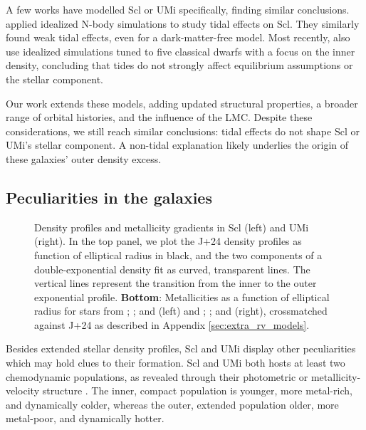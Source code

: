 A few works have modelled Scl or UMi specifically, finding similar
conclusions. \citet{iorio+2019} applied idealized N-body simulations to
study tidal effects on Scl. They similarly found weak tidal effects,
even for a dark-matter-free model. Most recently,
\citet{tchiorniy+genina2025} also use idealized simulations tuned to
five classical dwarfs with a focus on the inner density, concluding that
tides do not strongly affect equilibrium assumptions or the stellar
component.

Our work extends these models, adding updated structural properties, a
broader range of orbital histories, and the influence of the LMC.
Despite these considerations, we still reach similar conclusions: tidal
effects do not shape Scl or UMi's stellar component. A non-tidal
explanation likely underlies the origin of these galaxies' outer density
excess.

\subsection{Peculiarities in the
galaxies}\label{peculiarities-in-the-galaxies}

\begin{figure}
\centering
{}
\caption[Metallicity gradients in Scl and UMi]{Density profiles and
metallicity gradients in Scl (left) and UMi (right). In the top panel,
we plot the J+24 density profiles as function of elliptical radius in
black, and the two components of a double-exponential density fit as
curved, transparent lines. The vertical lines represent the transition
from the inner to the outer exponential profile. \textbf{Bottom}:
Metallicities as a function of elliptical radius for stars from
\citet{tolstoy+2023}; \citet{abdurrouf+2022}; and \citet{sestito+2023a}
(left) and \citet{pace+2020}; \citet{abdurrouf+2022}; and
\citet{sestito+2023b} (right), crossmatched against J+24 as described in
Appendix \ref{sec:extra_rv_models}.}\label{fig:metallicity_gradients}
\end{figure}

Besides extended stellar density profiles, Scl and UMi display other
peculiarities which may hold clues to their formation. Scl and UMi both
hosts at least two chemodynamic populations, as revealed through their
photometric or metallicity-velocity structure
\citep{tolstoy+2004, battaglia+2008, pace+2020}. The inner, compact
population is younger, more metal-rich, and dynamically colder, whereas
the outer, extended population older, more metal-poor, and dynamically
hotter.

